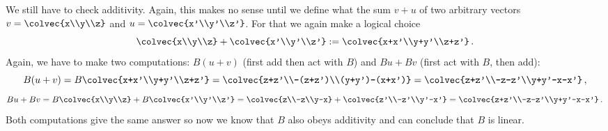 \begin{example}
We still have to check additivity. Again, this makes no sense until we define what the sum $v+u$ of two arbitrary vectors $v=\colvec{x\\y\\z}$ 
and $u=\colvec{x'\\y'\\z'}$. For that we again make a logical choice
$$
\colvec{x\\y\\z}+\colvec{x'\\y'\\z'}:=\colvec{x+x'\\y+y'\\z+z'}\, .
$$
Again, we have to make two computations: $B(u+v)$ (first add then act with $B$) and $Bu+Bv$ (first act with $B$, then add):
$$
B(u+v)=B\colvec{x+x'\\y+y'\\z+z'}=\colvec{z+z'\\-(z+z')\\(y+y')-(x+x')}=\colvec{z+z'\\-z-z'\\y+y'-x-x'}\, ,
$$
$$
Bu+Bv=B\colvec{x\\y\\z}+B\colvec{x'\\y'\\z'}=\colvec{z\\-z\\y-x}+\colvec{z'\\-z'\\y'-x'}=\colvec{z+z'\\-z-z'\\y+y'-x-x'}\, .
$$
Both computations give the same answer so now we know that $B$ also obeys additivity and can conclude that $B$ is linear.

\end{example}
